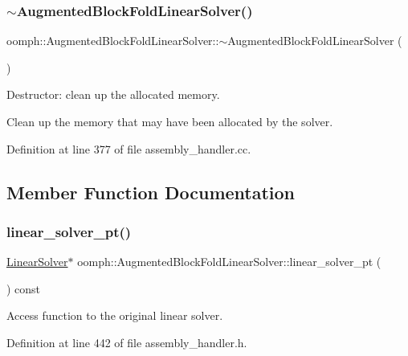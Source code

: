 \subsubsection{\texorpdfstring{$\sim$\+Augmented\+Block\+Fold\+Linear\+Solver()}{~AugmentedBlockFoldLinearSolver()}}
{\footnotesize\ttfamily oomph\+::\+Augmented\+Block\+Fold\+Linear\+Solver\+::$\sim$\+Augmented\+Block\+Fold\+Linear\+Solver (\begin{DoxyParamCaption}{ }\end{DoxyParamCaption})}



Destructor\+: clean up the allocated memory. 

Clean up the memory that may have been allocated by the solver. 

Definition at line 377 of file assembly\+\_\+handler.\+cc.



\subsection{Member Function Documentation}
\mbox{\label{classoomph_1_1AugmentedBlockFoldLinearSolver_a565f2b65d78f91ccac3fe2b03ac57dfc}} 
\subsubsection{\texorpdfstring{linear\+\_\+solver\+\_\+pt()}{linear\_solver\_pt()}}
{\footnotesize\ttfamily \hyperlink{classoomph_1_1LinearSolver}{Linear\+Solver}$\ast$ oomph\+::\+Augmented\+Block\+Fold\+Linear\+Solver\+::linear\+\_\+solver\+\_\+pt (\begin{DoxyParamCaption}{ }\end{DoxyParamCaption}) const\hspace{0.3cm}{\ttfamily [inline]}}



Access function to the original linear solver. 



Definition at line 442 of file assembly\+\_\+handler.\+h.



